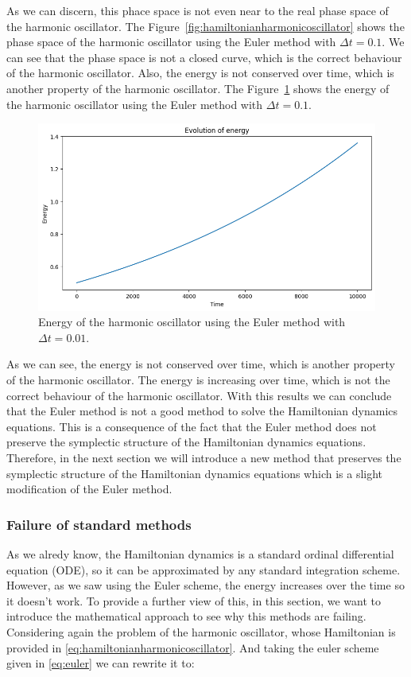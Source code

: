\documentclass{article}
\begin{document}
As we can discern, this phace space is not even near to the real phase space of the harmonic oscillator. The Figure~\ref{fig:hamiltonianharmonicoscillator} shows the phase space of the harmonic oscillator using the Euler method with \(\Delta t = 0.1\). We can see that the phase space is not a closed curve, which is the correct behaviour of the harmonic oscillator. Also, the energy is not conserved over time, which is another property of the harmonic oscillator. The Figure~\ref{fig:hamiltonianharmonicoscillatorenergy} shows the energy of the harmonic oscillator using the Euler method with \(\Delta t = 0.1\).

\begin{figure}[H]
	\centering
	\includegraphics[width=0.5\linewidth]{./Figures/Sympletic/eulerenergy1.png}
	\caption{Energy of the harmonic oscillator using the Euler method with \(\Delta t = 0.01\).}
	\label{fig:hamiltonianharmonicoscillatorenergy}
\end{figure}

As we can see, the energy is not conserved over time, which is another property of the harmonic oscillator. The energy is increasing over time, which is not the correct behaviour of the harmonic oscillator. With this results we can conclude that the Euler method is not a good method to solve the Hamiltonian dynamics equations. This is a consequence of the fact that the Euler method does not preserve the symplectic structure of the Hamiltonian dynamics equations. Therefore, in the next section we will introduce a new method that preserves the symplectic structure of the Hamiltonian dynamics equations which is a slight modification of the Euler method.

\subsubsection{Failure of standard methods}
\label{sec:failure_standard_methods}

As we alredy know, the Hamiltonian dynamics is a standard ordinal differential equation (ODE), so it can be approximated by any standard integration scheme. However, as we saw using the Euler scheme, the energy increases over the time so it doesn't work. To provide a further view of this, in this section, we want to introduce the mathematical approach to see why this methods are failing. Considering again the problem of the harmonic oscillator, whose Hamiltonian is provided in \ref{eq:hamiltonianharmonicoscillator}. And taking the euler scheme given in \ref{eq:euler} we can rewrite it to:
\end{document}
